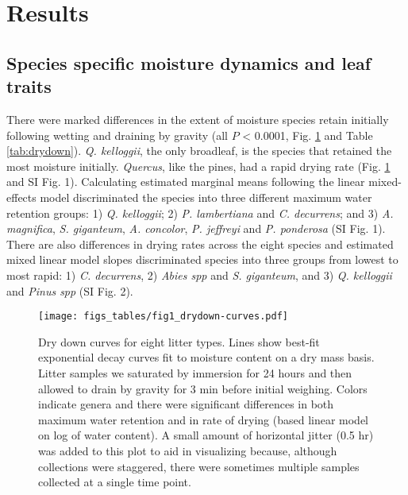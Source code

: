 \documentclass[letterpaper,12pt]{article}
\begin{document}
\section*{Results}

\subsection*{Species specific moisture dynamics and leaf traits}

There were marked differences in the extent of moisture species retain
initially following wetting and draining by gravity (all $P$ < 0.0001, Fig.
\ref{fig:drydown} and Table \ref{tab:drydown}). \emph{Q. kelloggii}, the only
broadleaf, is the species that retained the most moisture initially.
\emph{Quercus}, like the pines, had a rapid drying rate (Fig. \ref{fig:drydown}
and SI Fig. 1). Calculating estimated marginal means following the linear
mixed-effects model discriminated the species into three different maximum
water retention groups: 1) \emph{Q. kelloggii}; 2) \emph{P. lambertiana} and
\emph{C. decurrens}; and 3) \emph{A. magnifica}, \emph{S. giganteum}, \emph{A.
  concolor}, \emph{P. jeffreyi} and \emph{P. ponderosa} (SI Fig. 1). There are
also differences in drying rates across the eight species and estimated
mixed linear model slopes discriminated species into three groups from lowest
to most rapid: 1) \emph{C. decurrens}, 2) \emph{Abies spp} and \emph{S.
  giganteum}, and 3) \emph{Q. kelloggii} and \emph{Pinus spp} (SI Fig. 2).

\begin{figure}[h]
  \centering
\texttt{[image: figs\_tables/fig1\_drydown-curves.pdf]}
\caption{Dry down curves for eight litter types. Lines show best-fit
  exponential decay curves fit to moisture content on a dry mass basis. Litter
  samples we saturated by immersion for 24 hours and then allowed to drain by
  gravity for 3 min before initial weighing. Colors indicate genera and there
  were significant differences in both maximum water retention and in rate of
  drying (based linear model on log of water content). A small amount of
  horizontal jitter (0.5 hr) was added to this plot to aid in visualizing
  because, although collections were staggered, there were sometimes multiple
  samples collected at a single time point.}
 \label{fig:drydown}
\end{figure}
\end{document}
